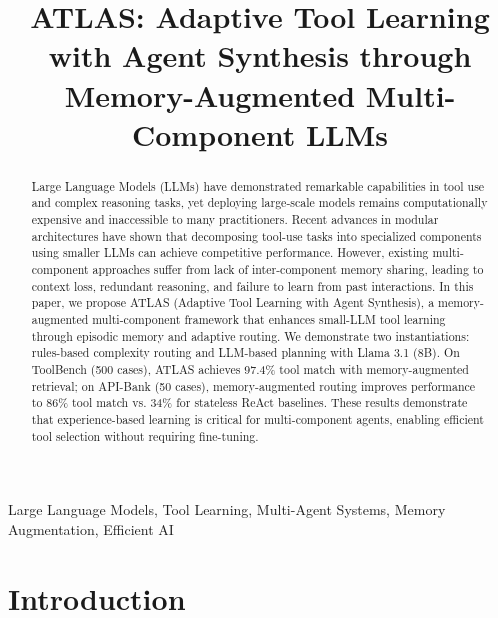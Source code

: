 \documentclass[conference]{IEEEtran}
\begin{document}
\title{ATLAS: Adaptive Tool Learning with Agent Synthesis through Memory-Augmented Multi-Component LLMs}

\author{
\and
{}
}

\maketitle

\begin{abstract}
Large Language Models (LLMs) have demonstrated remarkable capabilities in tool use and complex reasoning tasks, yet deploying large-scale models remains computationally expensive and inaccessible to many practitioners. Recent advances in modular architectures have shown that decomposing tool-use tasks into specialized components using smaller LLMs can achieve competitive performance. However, existing multi-component approaches suffer from lack of inter-component memory sharing, leading to context loss, redundant reasoning, and failure to learn from past interactions. In this paper, we propose ATLAS (Adaptive Tool Learning with Agent Synthesis), a memory-augmented multi-component framework that enhances small-LLM tool learning through episodic memory and adaptive routing. We demonstrate two instantiations: rules-based complexity routing and LLM-based planning with Llama 3.1 (8B). On ToolBench (500 cases), ATLAS achieves 97.4\% tool match with memory-augmented retrieval; on API-Bank (50 cases), memory-augmented routing improves performance to 86\% tool match vs. 34\% for stateless ReAct baselines. These results demonstrate that experience-based learning is critical for multi-component agents, enabling efficient tool selection without requiring fine-tuning.
\end{abstract}

\begin{IEEEkeywords}
Large Language Models, Tool Learning, Multi-Agent Systems, Memory Augmentation, Efficient AI
\end{IEEEkeywords}

\section{Introduction}
\end{document}
